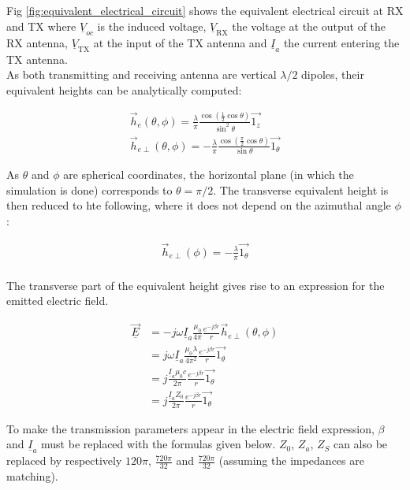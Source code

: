 \documentclass[10pt,a4paper]{ULBreport}
\begin{document}
Fig \ref{fig:equivalent_electrical_circuit} shows the equivalent electrical circuit at RX and TX where $\underline{V}_{oc}$ is the induced voltage, $\underline{V}_{\text{RX}}$ the voltage at the output of the RX antenna, $\underline{V}_{\text{TX}}$ at the input of the TX antenna and $\underline{I}_{a}$ the current entering the TX antenna.\\

As both transmitting and receiving antenna are vertical $\lambda/2$ dipoles, their equivalent heights can be analytically computed:

\begin{align*}
    \vec{h}_e (\theta, \phi) = \frac{\lambda}{\pi} \frac{\cos(\frac{1}{2}\cos \theta)}{\sin ^2 \theta}\vec{1_z}\\
    \vec{h}_{e\perp} (\theta, \phi) = -\frac{\lambda}{\pi} \frac{\cos(\frac{\pi}{2}\cos \theta)}{\sin \theta}\vec{1_\theta}
\end{align*}

As $\theta$ and $\phi$ are spherical coordinates, the horizontal plane (in which the simulation is done) corresponds to $\theta = \pi/2$. The transverse equivalent height is then reduced to hte following, where it does not depend on the azimuthal angle $\phi$:

\begin{align*}
    \vec{h}_{e\perp} (\phi) = -\frac{\lambda}{\pi} \vec{1_{\theta}}\\
\end{align*}

The transverse part of the equivalent height gives rise to an expression for the emitted electric field.

\begin{align*}
    \underline{\vec{E}} &= -j\omega \underline{I}_a \frac{\mu_0}{4\pi}\frac{e^{-j\beta r}}{r}\vec{h}_{e\perp}(\theta, \phi) \\
    &= j\omega \underline{I}_a \frac{\mu_0\lambda}{4\pi^2}\frac{e^{-j\beta r}}{r} \vec{1_{\theta}} \\
    &= j \frac{\underline{I}_a \mu_0 c}{2\pi} \frac{e^{-j\beta r}}{r} \vec{1_{\theta}}\\
    &= j \frac{\underline{I}_a Z_0}{2\pi} \frac{e^{-j\beta r}}{r} \vec{1_{\theta}}
\end{align*}

To make the transmission parameters appear in the electric field expression, $\beta$ and $\underline{I}_a$ must be replaced with the formulas given below. $Z_0$, $Z_a$, $Z_S$ can also be replaced by respectively $120\pi$, $\frac{720\pi}{32}$ and $\frac{720\pi}{32}$ (assuming the impedances are matching).
\end{document}
